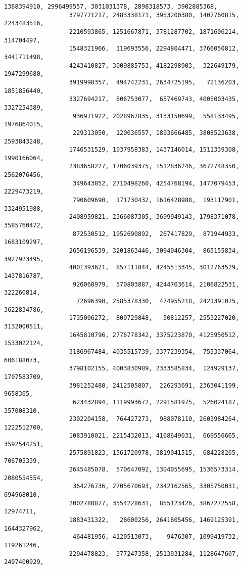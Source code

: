 \documentclass[11pt]{article}
\begin{document}
\begin{Verbatim}[commandchars=\\\{\}]
                  1368394910, 2996499557, 3031031378, 2898318573, 3902885368,
                  3797771217, 2483338171, 3953200380, 1407760815, 2243483516,
                  2210593865, 1251667871, 3781287702, 1871606214,  314704497,
                  1548321966,  119693556, 2294804471, 3766050812, 3441711498,
                  4243410827, 3009885753, 4182298903,  322649179, 1947299680,
                  3919998357,  494742231, 2634725195,   72136203, 1851856440,
                  3327694217,  806753077,  657469743, 4005003435, 3327254389,
                   936971922, 2028967835, 3133150699,  558133495, 1976864015,
                   229313050,  120036557, 1893666485, 3808523638, 2593843248,
                  1746531529, 1037958383, 1437146014, 1511339308, 1990166064,
                  2383658227, 1706039375, 1512836246, 3672748350, 2562076456,
                   349643852, 2710498260, 4254768194, 1477079453, 2229473219,
                   790609690,  171730432, 1616428988,  193117901, 3324951988,
                  2408959821, 2366087305, 3699949143, 1798371078, 3585760472,
                   872530512, 1952690892,  267417829,  871944933, 1683109297,
                  2656196539, 3201863446, 3094046304,  865155834, 3927923495,
                  4001393621,  857111844, 4245513345, 3012763529, 1437816787,
                   926060979,  570803887, 4244703614, 2106822531,  322260814,
                    72696390, 2585378330,  474955218, 2421391075, 3622834786,
                  1735006272,  809729848,   50812257, 2553227020, 3132000511,
                  1645810796, 2776778342, 3375223870, 4125950512, 1533022124,
                  3186967484, 4035515739, 3377239354,  755337064,  606188073,
                  3798102155, 4003830989, 2333585834,  124929137, 1707583709,
                  3981252480, 2412505807,  226293691, 2363041199,    9658365,
                   623432894, 1119993672, 2291581975,  526024187,  357008310,
                  2302204158,  764427273,  988078110, 2603984264, 1222512700,
                  1083910021, 2215432013, 4168649031,  669556665, 3592544251,
                  2575891823, 1561720978, 3819041515,  684228265,  706705339,
                  2645485078,  570647092, 1304055695, 1536573314, 2080554554,
                   364276736, 2705670693, 2342162565, 3305750031,  694968010,
                  2002780877, 3554228631,  855123426, 3867272558,   12974711,
                  1883431322,   28600256, 2641805456, 1469125391, 1644327962,
                   464481956, 4120513073,    9476307, 1099419732,  119261246,
                  2294478823,  377247358, 2513931284, 1128647607, 2497400929,

\end{Verbatim}
\end{document}
